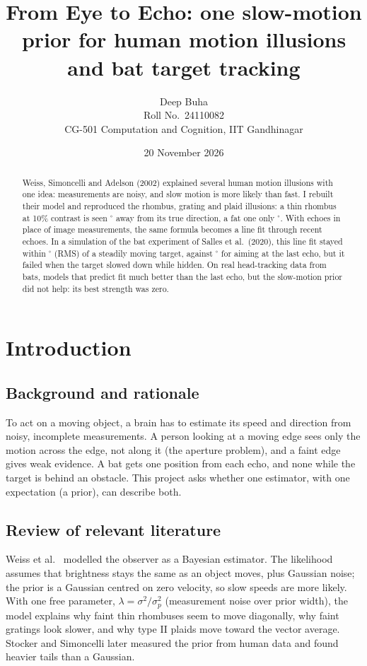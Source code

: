 \documentclass[11pt]{article}
\title{From Eye to Echo: one slow-motion prior for human motion illusions and bat target tracking}
\author{Deep Buha\\Roll No.\ 24110082\\CG-501 Computation and Cognition, IIT Gandhinagar}
\date{20 November 2026}
\begin{document}
\maketitle

\begin{abstract}
Weiss, Simoncelli and Adelson (2002) explained several human motion illusions with one idea: measurements are noisy, and slow motion is more likely than fast. I rebuilt their model and reproduced the rhombus, grating and plaid illusions: a thin rhombus at 10\% contrast is seen \humanThinLowErr$^\circ$ away from its true direction, a fat one only \humanFatLowErr$^\circ$. With echoes in place of image measurements, the same formula becomes a line fit through recent echoes. In a simulation of the bat experiment of Salles et al.\ (2020), this line fit stayed within \simSteadyRmsOurs$^\circ$ (RMS) of a steadily moving target, against \simSteadyRmsNonpred$^\circ$ for aiming at the last echo, but it failed when the target slowed down while hidden. On real head-tracking data from \realNBats{} bats, models that predict fit much better than the last echo, but the slow-motion prior did not help: its best strength was zero.
\end{abstract}

\section{Introduction}
\subsection{Background and rationale}
To act on a moving object, a brain has to estimate its speed and direction from noisy, incomplete measurements. A person looking at a moving edge sees only the motion across the edge, not along it (the aperture problem), and a faint edge gives weak evidence. A bat gets one position from each echo, and none while the target is behind an obstacle. This project asks whether one estimator, with one expectation (a prior), can describe both.

\subsection{Review of relevant literature}
Weiss et al.\ \cite{weiss2002} modelled the observer as a Bayesian estimator. The likelihood assumes that brightness stays the same as an object moves, plus Gaussian noise; the prior is a Gaussian centred on zero velocity, so slow speeds are more likely. With one free parameter, $\lambda=\sigma^2/\sigma_p^2$ (measurement noise over prior width), the model explains why faint thin rhombuses seem to move diagonally, why faint gratings look slower, and why type II plaids move toward the vector average. Stocker and Simoncelli \cite{stocker2005} later measured the prior from human data and found heavier tails than a Gaussian.
\end{document}
